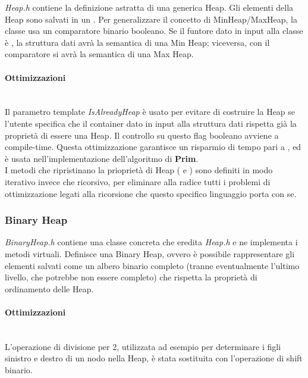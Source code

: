 \textit{Heap.h} contiene la definizione astratta di una generica Heap.
Gli elementi della Heap sono salvati in un .
Per generalizzare il concetto di MinHeap/MaxHeap, la classe usa un comparatore binario booleano. Se il funtore dato in input alla classe è
, la struttura dati avrà la semantica di una Min Heap; viceversa, con il comparatore  si avrà la semantica di una Max Heap.

\paragraph{Ottimizzazioni}\mbox{} \\

\noindent Il parametro template \textit{IsAlreadyHeap} è usato per evitare di costruire la Heap se l'utente specifica che il container dato in input alla struttura dati rispetta già la proprietà di essere una Heap. Il controllo su questo flag booleano avviene a compile-time. Questa ottimizzazione garantisce un risparmio di tempo pari a \complexityN{}, ed è usata nell'implementazione dell'algoritmo di \textbf{Prim}. \\

\noindent I metodi che ripristinano la prioprietà di Heap ( e ) sono definiti in modo iterativo invece che ricorsivo, per eliminare alla radice tutti i problemi di ottimizzazione legati alla ricorsione che questo specifico linguaggio porta con se.

\subsubsection{Binary Heap}

\textit{BinaryHeap.h} contiene una classe concreta che eredita \textit{Heap.h} e ne implementa i metodi virtuali. Definisce una Binary Heap, ovvero è possibile rappresentare gli elementi salvati come un albero binario completo (tranne eventualmente l'ultimo livello, che potrebbe non essere completo) che rispetta la proprietà di ordinamento delle Heap.

\paragraph{Ottimizzazioni}\mbox{} \\

\noindent L'operazione di divisione per 2, utilizzata ad esempio per determinare i figli sinistro e destro di un nodo nella Heap, è stata sostituita con l'operazione di shift binario.

